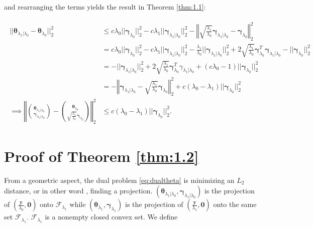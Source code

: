 and rearranging the terms yields the result in Theorem \ref{thm:1.1}:

\begin{gather}
    \begin{aligned}
        ||\boldsymbol\theta_{\lambda_1|\lambda_0}-\boldsymbol\theta_{\lambda_0}||_2^2&\leq c\lambda_0||\boldsymbol\gamma_{\lambda_0}||_2^2-c\lambda_1||\boldsymbol\gamma_{\lambda_1|\lambda_0}||_2^2-\left\Vert\sqrt{\frac{\lambda_1}{\lambda_0}}\boldsymbol\gamma_{\lambda_1|\lambda_0}-\boldsymbol\gamma_{\lambda_0}\right\Vert_2^2\\
        &=c\lambda_0||\boldsymbol\gamma_{\lambda_0}||_2^2-c\lambda_1||\boldsymbol\gamma_{\lambda_1|\lambda_0}||_2^2-\frac{\lambda_1}{\lambda_0}||\boldsymbol\gamma_{\lambda_1|\lambda_0}||_2^2+2\sqrt{\frac{\lambda_1}{\lambda_0}}\boldsymbol\gamma_{\lambda_0}^T\boldsymbol\gamma_{\lambda_1|\lambda_0}-||\boldsymbol\gamma_{\lambda_0}||_2^2\\
        &=-||\boldsymbol\gamma_{\lambda_1|\lambda_0}||_2^2+2\sqrt{\frac{\lambda_1}{\lambda_0}}\boldsymbol\gamma_{\lambda_0}^T\gamma_{\lambda_1|\lambda_0}+(c\lambda_0-1)||\boldsymbol\gamma_{\lambda_0}||_2^2\\
        &=-\left\Vert\boldsymbol\gamma_{\lambda_1|\lambda_0}-\sqrt{\frac{\lambda_1}{\lambda_0}}\boldsymbol\gamma_{\lambda_0}\right\Vert_2^2+c(\lambda_0-\lambda_1)||\boldsymbol\gamma_{\lambda_0}||_2^2\\
        \implies \left\Vert\binom{\boldsymbol\theta_{\lambda_1|\lambda_0}}{\boldsymbol\gamma_{\lambda_1|\lambda_0}}-\binom{\boldsymbol\theta_{\lambda_0}}{\sqrt{\frac{\lambda_1}{\lambda_0}}\boldsymbol\gamma_{\lambda_0}}\right\Vert_2^2&\leq c(\lambda_0-\lambda_1)||\boldsymbol\gamma_{\lambda_0}||_2^2.
    \end{aligned}
\end{gather}

\section{Proof of Theorem \ref{thm:1.2}}

From a geometric aspect, the dual problem \eqref{eq:dualtheta} is minimizing an $L_2$ distance, or in other word , finding a projection. $(\boldsymbol \theta_{\lambda_1|\lambda_0},\boldsymbol \gamma_{\lambda_1|\lambda_0})$ is the projection of $(\frac{\boldsymbol y}{\lambda_0},\boldsymbol0)$ onto $\mathcal{F}_{\lambda_1}$ while $(\boldsymbol \theta_{\lambda_1},\boldsymbol \gamma_{\lambda_1})$ is the projection of $(\frac{\boldsymbol y}{\lambda_1},\boldsymbol0)$ onto the same set $\mathcal{F}_{\lambda_1}$. $\mathcal{F}_{\lambda_1}$ is a nonempty closed convex set. We define

